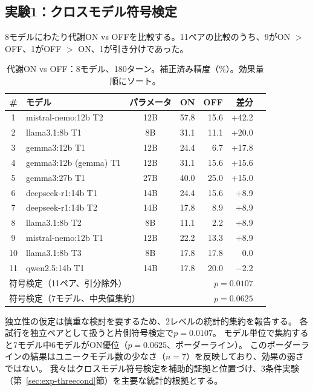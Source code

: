 \documentclass[11pt,a4paper]{article}
\begin{document}
\subsection{実験1：クロスモデル符号検定}
\label{sec:exp-signtest}

8モデルにわたり代謝ON vs OFFを比較する。11ペアの比較のうち、9がON $>$ OFF、1がOFF $>$ ON、1が引き分けであった。

\begin{table}[htbp]
\centering
\caption{代謝ON vs OFF：8モデル、180ターン。補正済み精度（\%）。効果量順にソート。}
\label{tab:signtest}
\begin{tabular}{clcrrrr}
\toprule
\# & モデル & パラメータ & ON & OFF & 差分 \\
\midrule
1 & mistral-nemo:12b T2 & 12B & 57.8 & 15.6 & +42.2 \\
2 & llama3.1:8b T1 & 8B & 31.1 & 11.1 & +20.0 \\
3 & gemma3:12b T1 & 12B & 24.4 & 6.7 & +17.8 \\
4 & gemma3:12b (gemma) T1 & 12B & 31.1 & 15.6 & +15.6 \\
5 & gemma3:27b T1 & 27B & 40.0 & 25.0 & +15.0 \\
6 & deepseek-r1:14b T1 & 14B & 24.4 & 15.6 & +8.9 \\
7 & deepseek-r1:14b T2 & 14B & 17.8 & 8.9 & +8.9 \\
8 & llama3.1:8b T2 & 8B & 11.1 & 2.2 & +8.9 \\
9 & mistral-nemo:12b T1 & 12B & 22.2 & 13.3 & +8.9 \\
10 & llama3.1:8b T3 & 8B & 17.8 & 17.8 & 0.0 \\
11 & qwen2.5:14b T1 & 14B & 17.8 & 20.0 & $-$2.2 \\
\midrule
\multicolumn{3}{l}{符号検定（11ペア、引分除外）} & \multicolumn{3}{r}{$p = 0.0107$} \\
\multicolumn{3}{l}{符号検定（7モデル、中央値集約）} & \multicolumn{3}{r}{$p = 0.0625$} \\
\bottomrule
\end{tabular}
\end{table}

独立性の仮定は慎重な検討を要するため、2レベルの統計的集約を報告する。
各試行を独立ペアとして扱うと片側符号検定で$p = 0.0107$。
モデル単位で集約すると7モデル中6モデルがON優位（$p = 0.0625$、ボーダーライン）。
このボーダーラインの結果はユニークモデル数の少なさ（$n = 7$）を反映しており、効果の弱さではない。
我々はクロスモデル符号検定を補助的証拠と位置づけ、3条件実験（第~\ref{sec:exp-threecond}節）を主要な統計的根拠とする。
\end{document}
